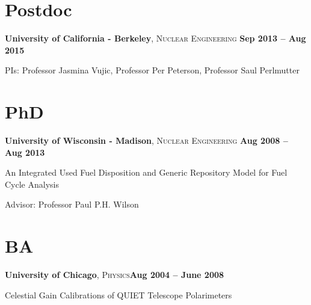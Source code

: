 \documentclass[margin,line]{resume}
\begin{document}
\begin{resume}
    \section{\mysidestyle Postdoc}
    \textbf{University of California - Berkeley}, \textsc{Nuclear Engineering}\hfill \textbf{ Sep 2013 -- Aug 2015}\vspace{-3mm}\\\vspace{-1mm}%
    \begin{list2}
        \item PIs:  Professor Jasmina Vujic, Professor Per Peterson, Professor Saul Perlmutter
    \end{list2}
    \section{\mysidestyle PhD}
    \textbf{University of Wisconsin - Madison}, \textsc{Nuclear Engineering}\hfill \textbf{ Aug 2008 -- Aug 2013}\vspace{-3mm}\\\vspace{-1mm}%
    \begin{list2}
        \item An Integrated Used Fuel Disposition and Generic Repository Model for Fuel Cycle Analysis
        \item Advisor:  Professor Paul P.H. Wilson
    \end{list2}\vspace{-1.5mm}
    \section{\mysidestyle BA}
    \textbf{University of Chicago}, \textsc{Physics}\hfill\textbf{Aug 2004 -- June 2008}\vspace{-3mm}\\\vspace{-1mm}%
    \begin{list2}
	\item Celestial Gain Calibrations of QUIET Telescope Polarimeters
    \end{list2}\vspace{-1.5mm}


\end{resume}
\end{document}

